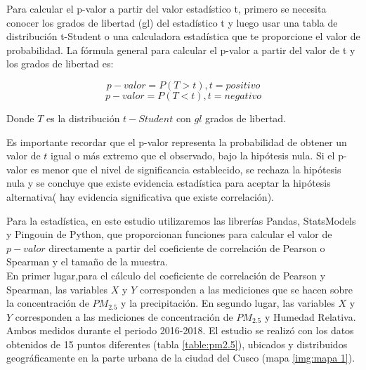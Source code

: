 \documentclass[a4paper,11pt]{article}
\begin{document}
Para calcular el p-valor a partir del valor estadístico t, primero se necesita conocer los grados de libertad (gl) del estadístico t y luego usar una tabla de distribución t-Student o una calculadora estadística que te proporcione el valor de probabilidad. La fórmula general para calcular el p-valor a partir del valor de t y los grados de libertad es:


\begin{equation}
\label{equation: e4}
p-valor = P(T > t),  t=positivo
\end{equation}
\begin{equation}
\label{equation: e5}
p-valor = P(T < t),  t=negativo
\end{equation}

Donde $T$ es la distribución $t-Student$ con $gl$ grados de libertad.

Es importante recordar que el p-valor representa la probabilidad de obtener un valor de $t$ igual o más extremo que el observado, bajo la hipótesis nula. Si el p-valor es menor que el nivel de significancia establecido, se rechaza la hipótesis nula y se concluye que existe evidencia estadística para aceptar la hipótesis alternativa( hay evidencia significativa que existe correlación).

Para la estadística, en este estudio utilizaremos las librerías Pandas, StatsModels y Pingouin de Python, que proporcionan funciones para calcular el valor de $p-valor$ directamente a partir del coeficiente de correlación de Pearson o Spearman y el tamaño de la muestra.\\


En primer lugar,para el cálculo del coeficiente de correlación de Pearson y Spearman, las variables $X$ y $Y$ corresponden a las mediciones que se hacen sobre la concentración de $PM_{2.5}$ y la precipitación. En segundo lugar, las variables $X$ y $Y$ corresponden a las mediciones de concentración de $PM_{2.5}$ y Humedad Relativa. Ambos medidos durante el periodo 2016-2018. El estudio se realizó con los datos obtenidos de 15 puntos diferentes (tabla \ref{table:pm2.5}), ubicados y distribuidos geográficamente en la parte urbana de la ciudad del Cusco (mapa \ref{img:mapa 1}).
\end{document}
